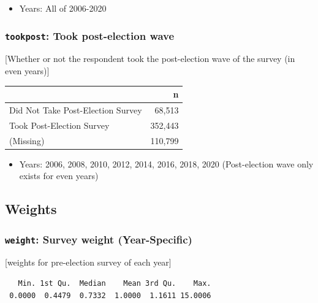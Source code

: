 \documentclass[10pt,article,oneside]{memoir}
\theoremstyle{definition}
\begin{document}
\begin{itemize}
\tightlist
\item
  Years: All of 2006-2020
\end{itemize}

\hypertarget{tookpost-took-post-election-wave}{%
\subsubsection{\texorpdfstring{\texttt{tookpost}: Took post-election
wave}{tookpost: Took post-election wave}}\label{tookpost-took-post-election-wave}}

{[}Whether or not the respondent took the post-election wave of the
survey (in even years){]}

\begin{table}[H]
\centering
\begin{tabular}{lr}
\toprule
 & n\\
\midrule
Did Not Take Post-Election Survey & 68,513\\
Took Post-Election Survey & 352,443\\
(Missing) & 110,799\\
\bottomrule
\end{tabular}
\end{table}

\begin{itemize}
\tightlist
\item
  Years: 2006, 2008, 2010, 2012, 2014, 2016, 2018, 2020 (Post-election
  wave only exists for even years)
\end{itemize}

\hypertarget{weights}{%
\subsection{Weights}\label{weights}}

\hypertarget{weight-survey-weight-year-specific}{%
\subsubsection{\texorpdfstring{\texttt{weight}: Survey weight
(Year-Specific)}{weight: Survey weight (Year-Specific)}}\label{weight-survey-weight-year-specific}}

{[}weights for pre-election survey of each year{]}

\begin{verbatim}
   Min. 1st Qu.  Median    Mean 3rd Qu.    Max. 
 0.0000  0.4479  0.7332  1.0000  1.1611 15.0006 
\end{verbatim}
\end{document}
